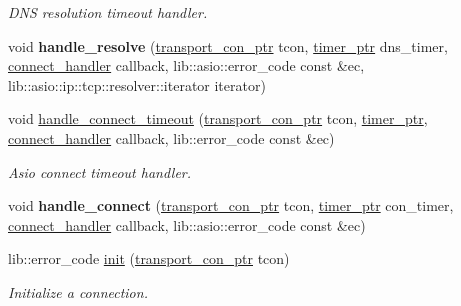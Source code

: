 \begin{DoxyCompactItemize}
\begin{DoxyCompactList}\small\item\em D\+NS resolution timeout handler. \end{DoxyCompactList}\item 
\mbox{\label{classwebsocketpp_1_1transport_1_1asio_1_1endpoint_a97ded7b145e9d358747b7e0c0099594e}} 
void {\bfseries handle\+\_\+resolve} (\mbox{\hyperlink{classwebsocketpp_1_1transport_1_1asio_1_1endpoint_ac5fc306f32d15f92dd1b22366eaba62d}{transport\+\_\+con\+\_\+ptr}} tcon, \mbox{\hyperlink{classwebsocketpp_1_1transport_1_1asio_1_1endpoint_a1802f5762009dbed117ff793fa87468f}{timer\+\_\+ptr}} dns\+\_\+timer, \mbox{\hyperlink{namespacewebsocketpp_1_1transport_ac392fca34e946b48414278c0c3addfa5}{connect\+\_\+handler}} callback, lib\+::asio\+::error\+\_\+code const \&ec, lib\+::asio\+::ip\+::tcp\+::resolver\+::iterator iterator)
\item 
void \mbox{\hyperlink{classwebsocketpp_1_1transport_1_1asio_1_1endpoint_adf26b0ddc55fd6d223fd74be9e25d961}{handle\+\_\+connect\+\_\+timeout}} (\mbox{\hyperlink{classwebsocketpp_1_1transport_1_1asio_1_1endpoint_ac5fc306f32d15f92dd1b22366eaba62d}{transport\+\_\+con\+\_\+ptr}} tcon, \mbox{\hyperlink{classwebsocketpp_1_1transport_1_1asio_1_1endpoint_a1802f5762009dbed117ff793fa87468f}{timer\+\_\+ptr}}, \mbox{\hyperlink{namespacewebsocketpp_1_1transport_ac392fca34e946b48414278c0c3addfa5}{connect\+\_\+handler}} callback, lib\+::error\+\_\+code const \&ec)
\begin{DoxyCompactList}\small\item\em Asio connect timeout handler. \end{DoxyCompactList}\item 
\mbox{\label{classwebsocketpp_1_1transport_1_1asio_1_1endpoint_a1d2dd1fcad6099397b53e5f6ede001a0}} 
void {\bfseries handle\+\_\+connect} (\mbox{\hyperlink{classwebsocketpp_1_1transport_1_1asio_1_1endpoint_ac5fc306f32d15f92dd1b22366eaba62d}{transport\+\_\+con\+\_\+ptr}} tcon, \mbox{\hyperlink{classwebsocketpp_1_1transport_1_1asio_1_1endpoint_a1802f5762009dbed117ff793fa87468f}{timer\+\_\+ptr}} con\+\_\+timer, \mbox{\hyperlink{namespacewebsocketpp_1_1transport_ac392fca34e946b48414278c0c3addfa5}{connect\+\_\+handler}} callback, lib\+::asio\+::error\+\_\+code const \&ec)
\item 
lib\+::error\+\_\+code \mbox{\hyperlink{classwebsocketpp_1_1transport_1_1asio_1_1endpoint_a756059ab3ecd99d7c2a845b40729c7c8}{init}} (\mbox{\hyperlink{classwebsocketpp_1_1transport_1_1asio_1_1endpoint_ac5fc306f32d15f92dd1b22366eaba62d}{transport\+\_\+con\+\_\+ptr}} tcon)
\begin{DoxyCompactList}\small\item\em Initialize a connection. \end{DoxyCompactList}\end{DoxyCompactItemize}


